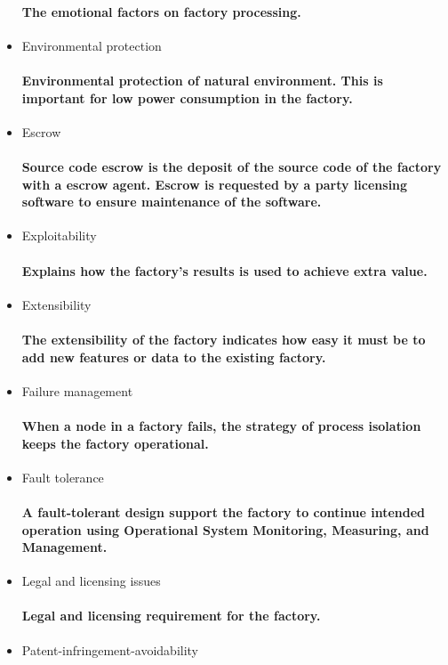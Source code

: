 \begin{itemize}
  \paragraph{The emotional factors on factory processing.}
  \item Environmental protection
  \paragraph{Environmental protection of natural environment. This is important for low power consumption in the factory.}
  \item Escrow
  \paragraph{Source code escrow is the deposit of the source code of the factory with a escrow agent. Escrow is requested by a party licensing software to ensure maintenance of the software.}
  \item Exploitability
  \paragraph{Explains how the factory's results is used to achieve extra value.}
  \item Extensibility
  \paragraph{The extensibility of the factory indicates how easy it must be to add new features or data to the existing factory.}
  \item Failure management
  \paragraph{When a node in a factory fails, the strategy of process isolation keeps the factory operational.}
  \item Fault tolerance 
  \paragraph{A fault-tolerant design support the factory to continue intended operation using Operational System Monitoring, Measuring, and Management.}
  \item Legal and licensing issues
  \paragraph{Legal and licensing requirement for the factory.}
  \item Patent-infringement-avoidability

\end{itemize}
